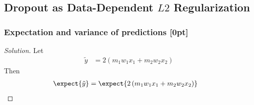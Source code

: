 \documentclass{article}
\begin{document}
	\subsection{Dropout as Data-Dependent $L2$ Regularization}
	\subsubsection{Expectation and variance of predictions [0pt]}
	\begin{proof}[Solution]
		Let
		\begin{align}
			\tilde{y} &= 2\left(m_{1} w_{1} x_{1}+m_{2} w_{2} x_{2}\right)
		\end{align}
		Then
		\begin{align}
			\expect{\tilde{y}} &= \expect{2\left(m_{1} w_{1} x_{1}+m_{2} w_{2} x_{2}\right)}
		\end{align}
	\end{proof}
	
\end{document}
